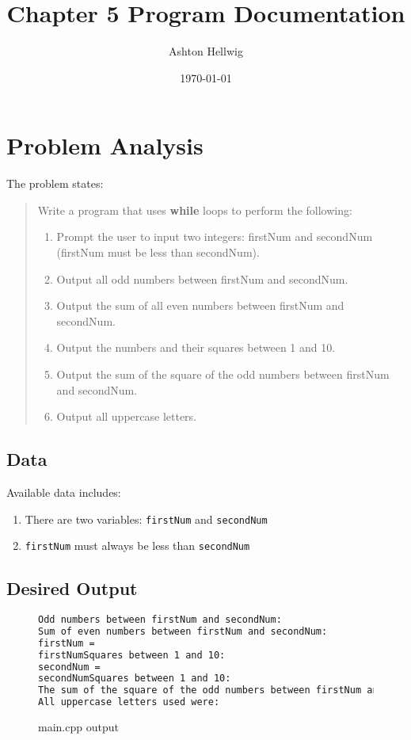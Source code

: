 \documentclass[a4paper,11pt]{article}
\title{Chapter 5 Program Documentation}
\author{Ashton Hellwig}
\date\today
\begin{document}
  \maketitle
  \tableofcontents
  \listoffigures
  \newpage


  \section{Problem Analysis}
    The problem states:
    \begin{quotation}
      Write a program that uses \textbf{while} loops to perform the following:
      \begin{enumerate}
        \item Prompt the user to input two integers: firstNum and secondNum
          (firstNum must be less than secondNum).
        \item Output all odd numbers between firstNum and secondNum.
        \item Output the sum of all even numbers between firstNum and secondNum.
        \item Output the numbers and their squares between 1 and 10.
        \item Output the sum of the square of the odd numbers between firstNum
          and secondNum.
        \item Output all uppercase letters.
      \end{enumerate}
    \end{quotation}

    \subsection{Data}
      Available data includes:
      \begin{enumerate}
        \item There are two variables: \texttt{firstNum} and \texttt{secondNum}
        \item \texttt{firstNum} must always be less than \texttt{secondNum}
      \end{enumerate}

    \subsection{Desired Output}
      \begin{figure}[h]
        \caption{main.cpp output}
        \begin{lstlisting}[language=bash]
Odd numbers between firstNum and secondNum:
Sum of even numbers between firstNum and secondNum:
firstNum =
firstNumSquares between 1 and 10: 
secondNum =
secondNumSquares between 1 and 10:
The sum of the square of the odd numbers between firstNum and secondNum =
All uppercase letters used were:
        \end{lstlisting}
        \label{fig:do}
      \end{figure}
\end{document}
